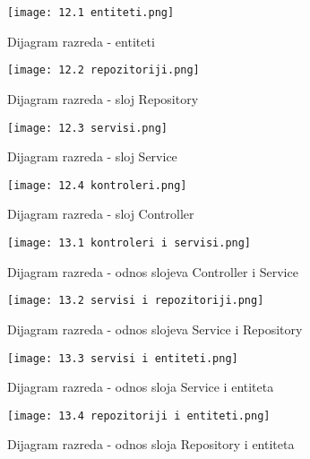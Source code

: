 		\eject
		
				\begin{figure}[H]
					\centering
					\texttt{[image: 12.1 entiteti.png]}
					\caption{Dijagram razreda - entiteti}
				\end{figure}	
				
				\begin{figure}[H]
					\centering
					\texttt{[image: 12.2 repozitoriji.png]}
					\caption{Dijagram razreda - sloj Repository}
				\end{figure}	
				
				\begin{figure}[H]
					\centering
					\texttt{[image: 12.3 servisi.png]}
					\caption{Dijagram razreda - sloj Service}
				\end{figure}	
				
				\begin{figure}[H]
					\centering
					\texttt{[image: 12.4 kontroleri.png]}
					\caption{Dijagram razreda - sloj Controller}
				\end{figure}	
				
				\begin{figure}[H]
					\centering
					\texttt{[image: 13.1 kontroleri i servisi.png]}
					\caption{Dijagram razreda - odnos slojeva Controller i Service}
				\end{figure}	
				
				\begin{figure}[H]
					\centering
					\texttt{[image: 13.2 servisi i repozitoriji.png]}
					\caption{Dijagram razreda - odnos slojeva Service i Repository}
				\end{figure}	
				
				\begin{figure}[H]
					\centering
					\texttt{[image: 13.3 servisi i entiteti.png]}
					\caption{Dijagram razreda - odnos sloja Service i entiteta}
				\end{figure}	
				
				\begin{figure}[H]
					\centering
					\texttt{[image: 13.4 repozitoriji i entiteti.png]}
					\caption{Dijagram razreda - odnos sloja Repository i entiteta}
				\end{figure}	
			
